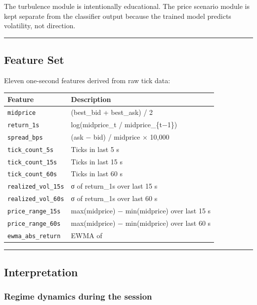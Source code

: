\documentclass[
]{article}
\begin{document}
The turbulence module is intentionally educational. The price scenario
module is kept separate from the classifier output because the trained
model predicts volatility, not direction.

\begin{center}\rule{0.5\linewidth}{0.5pt}\end{center}

\hypertarget{feature-set}{%
\subsection{Feature Set}\label{feature-set}}

Eleven one-second features derived from raw tick data:

\begin{longtable}[]{@{}ll@{}}
\toprule
Feature & Description \\
\midrule
\endhead
\texttt{midprice} & (best\_bid + best\_ask) / 2 \\
\texttt{return\_1s} & log(midprice\_t / midprice\_\{t−1\}) \\
\texttt{spread\_bps} & (ask − bid) / midprice × 10,000 \\
\texttt{tick\_count\_5s} & Ticks in last 5 s \\
\texttt{tick\_count\_15s} & Ticks in last 15 s \\
\texttt{tick\_count\_60s} & Ticks in last 60 s \\
\texttt{realized\_vol\_15s} & σ of return\_1s over last 15 s \\
\texttt{realized\_vol\_60s} & σ of return\_1s over last 60 s \\
\texttt{price\_range\_15s} & max(midprice) − min(midprice) over last 15
s \\
\texttt{price\_range\_60s} & max(midprice) − min(midprice) over last 60
s \\
\texttt{ewma\_abs\_return} & EWMA of \\
\bottomrule
\end{longtable}

\begin{center}\rule{0.5\linewidth}{0.5pt}\end{center}

\hypertarget{interpretation}{%
\subsection{Interpretation}\label{interpretation}}

\hypertarget{regime-dynamics-during-the-session}{%
\subsubsection{Regime dynamics during the
session}\label{regime-dynamics-during-the-session}}
\end{document}
